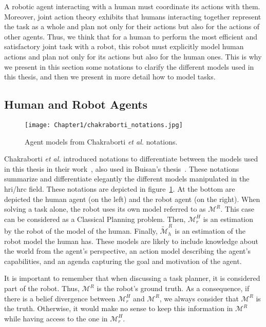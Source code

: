 A robotic agent interacting with a human must coordinate its actions with them. Moreover, joint action theory exhibits that humans interacting together represent the task as a whole and plan not only for their actions but also for the actions of other agents. Thus, we think that for a human to perform the most efficient and satisfactory joint task with a robot, this robot must explicitly model human actions and plan not only for its actions but also for the human ones. This is why we present in this section some notations to clarify the different models used in this thesis, and then we present in more detail how to model tasks.

\subsection{Human and Robot Agents}

\begin{figure}[h]
    \centering
    \texttt{[image: Chapter1/chakraborti\_notations.jpg]}
    \caption{Agent models from Chakraborti \textit{et al.} notations.}
    \label{fig:chakraborti_notations}
\end{figure}

Chakraborti \textit{et al.} introduced notations to differentiate between the models used in this thesis in their work~\cite{ChakrabortiBTZS15}, also used in Buisan's thesis~\cite{thesisBuisan21}. These notations summarize and differentiate elegantly the different models manipulated in the \acrshort{hri}/\acrshort{hrc} field. These notations are depicted in figure~\ref{fig:chakraborti_notations}. At the bottom are depicted the human agent (on the left) and the robot agent (on the right). When solving a task alone, the robot uses its own model referred to as $\mathcal{M}^R$. This case can be considered as a Classical Planning problem. 
Then, $\mathcal{M}^H_r$ is an estimation by the robot of the model of the human. Finally, $\tilde{\mathcal{M}}^R_h$ is an estimation of the robot model the human has. These models are likely to include knowledge about the world from the agent's perspective, an action model describing the agent's capabilities, and an agenda capturing the goal and motivation of the agent.

It is important to remember that when discussing a task planner, it is considered part of the robot. Thus, $\mathcal{M}^R$ is the robot's ground truth. As a consequence, if there is a belief divergence between $\mathcal{M}^H_r$ and $\mathcal{M}^R$, we always consider that $\mathcal{M}^R$ is the truth. Otherwise, it would make no sense to keep this information in $\mathcal{M}^R$ while having access to the one in $\mathcal{M}^H_r$.

